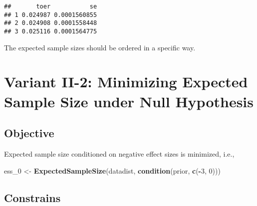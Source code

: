 \documentclass[]{book}
\newenvironment{Shaded}{\begin{snugshade}}{\end{snugshade}}
\newcommand{\DecValTok}[1]{\textcolor[rgb]{0.00,0.00,0.81}{#1}}
\newcommand{\KeywordTok}[1]{\textcolor[rgb]{0.13,0.29,0.53}{\textbf{#1}}}
\newcommand{\NormalTok}[1]{#1}
\newcommand{\OperatorTok}[1]{\textcolor[rgb]{0.81,0.36,0.00}{\textbf{#1}}}
\newcommand{\StringTok}[1]{\textcolor[rgb]{0.31,0.60,0.02}{#1}}
\begin{document}
\begin{verbatim}
##       toer           se
## 1 0.024987 0.0001560855
## 2 0.024908 0.0001558448
## 3 0.025116 0.0001564775
\end{verbatim}

The expected sample sizes should be ordered in a specific way.

\begin{Shaded}
\end{Shaded}

\hypertarget{variantII_2}{%
\section{Variant II-2: Minimizing Expected Sample Size under Null Hypothesis}\label{variantII_2}}

\hypertarget{objective-4}{%
\subsection{Objective}\label{objective-4}}

Expected sample size conditioned on negative effect sizes is minimized, i.e.,

\begin{Shaded}
\begin{Highlighting}[]
\NormalTok{ess_}\DecValTok{0}\NormalTok{ <-}\StringTok{ }\KeywordTok{ExpectedSampleSize}\NormalTok{(datadist, }\KeywordTok{condition}\NormalTok{(prior, }\KeywordTok{c}\NormalTok{(}\OperatorTok{-}\DecValTok{3}\NormalTok{, }\DecValTok{0}\NormalTok{)))}
\end{Highlighting}
\end{Shaded}

\hypertarget{constrains-4}{%
\subsection{Constrains}\label{constrains-4}}
\end{document}
